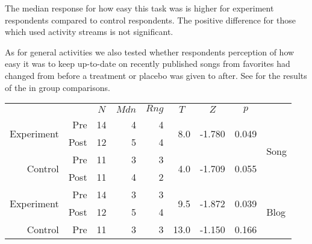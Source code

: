 The median response for how easy this task was is higher for
experiment respondents compared to control respondents. The positive
difference for those which used activity streams is not significant.

As for general activities we also tested whether respondents perception
of how easy it was to keep up-to-date on recently published songs from
favorites had changed from before a treatment or placebo was given to after.
See 
 for the results of the
in group comparisons.

\begin{table}
  \begin{tabular}{rrrrrrrrl}

    &
    &
    \multicolumn{1}{c}{$N$} &
    \multicolumn{1}{c}{$Mdn$} &
    \multicolumn{1}{c}{$Rng$} &
    \multicolumn{1}{c}{$T$} &
    \multicolumn{1}{c}{$Z$} &
    \multicolumn{1}{c}{$p$} &
    \\

    \cmidrule(lr){3-8}

      \multirow{2}{*}{Experiment} &
        Pre &
        14 &
        4 &
        4 &
        \multirow{2}{*}{8.0} &
        \multirow{2}{*}{-1.780} &
        \multirow{2}{*}{0.049} &
        \multirow{4}{*}{Song} \\

        &
        Post &
        12 &
        5 &
        4 &
        &
        &
        \\

      \multirow{2}{*}{Control} &
        Pre &
        11 &
        3 &
        3 &
        \multirow{2}{*}{4.0} &
        \multirow{2}{*}{-1.709} &
        \multirow{2}{*}{0.055} &
        \\

        &
        Post &
        11 &
        4 &
        2 &
        &
        &
        \\

    \cmidrule(lr){2-8}

      \multirow{2}{*}{Experiment} &
        Pre &
        14 &
        3 &
        3 &
        \multirow{2}{*}{9.5} &
        \multirow{2}{*}{-1.872} &
        \multirow{2}{*}{0.039} &
        \multirow{4}{*}{Blog} \\

        &
        Post &
        12 &
        5 &
        4 &
        &
        &
        \\

      \multirow{2}{*}{Control} &
        Pre &
        11 &
        3 &
        3 &
        \multirow{2}{*}{13.0} &
        \multirow{2}{*}{-1.150} &
        \multirow{2}{*}{0.166} &
        \\


\end{tabular}
\end{table}
